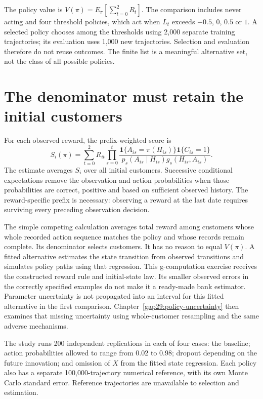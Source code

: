 The policy value is $V(\pi)=E_\pi[\sum_{t=0}^2R_t]$. The comparison includes
never acting and four threshold policies, which act when $L_t$ exceeds
$-0.5$, $0$, $0.5$ or $1$. A selected policy chooses among the thresholds
using 2,000 separate training trajectories; its evaluation uses 1,000 new
trajectories. Selection and evaluation therefore do not reuse outcomes.
The finite list is a meaningful alternative set, not the class of all
possible policies.

\section{The denominator must retain the initial customers}
For each observed reward, the prefix-weighted score is
\[
 S_i(\pi)=\sum_{t=0}^2 R_{it}
  \prod_{s=0}^t
  \frac{\mathbf1\{A_{is}=\pi(H_{is})\}\mathbf1\{C_{is}=1\}}
       {p_s(A_{is}\mid H_{is})g_s(H_{is},A_{is})}.
\]
The estimate averages $S_i$ over all initial customers. Successive conditional
expectations remove the observation and action probabilities when those
probabilities are correct, positive and based on sufficient observed history.
The reward-specific prefix is necessary: observing a reward at the last date
requires surviving every preceding observation decision.

The simple competing calculation averages total reward among customers whose
whole recorded action sequence matches the policy and whose records remain
complete. Its denominator selects customers. It has no reason to equal
$V(\pi)$. A fitted alternative estimates the state transition from observed
transitions and simulates policy paths using that regression. This
g-computation exercise receives the constructed reward rule and initial-state
law. Its smaller observed errors in the correctly specified examples do not
make it a ready-made bank estimator. Parameter uncertainty is not propagated
into an interval for this fitted alternative in the first comparison.
Chapter~\ref{gap29:policy-uncertainty} then examines that missing uncertainty
using whole-customer resampling and the same adverse mechanisms.

The study runs 200 independent replications in each of four cases: the
baseline; action probabilities allowed to range from 0.02 to 0.98; dropout
depending on the future innovation; and omission of $X$ from the fitted state
regression. Each policy also has a separate 100,000-trajectory numerical
reference, with its own Monte Carlo standard error. Reference trajectories
are unavailable to selection and estimation.

